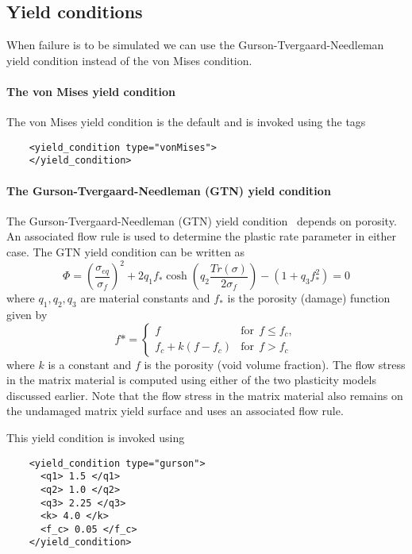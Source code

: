   \subsection{Yield conditions}
  When failure is to be simulated we can use the Gurson-Tvergaard-Needleman
  yield condition instead of the von Mises condition.

  \paragraph{The von Mises yield condition}
  The von Mises yield condition is the default and is invoked using the tags
  \lstset{language=XML}
  \begin{lstlisting}
    <yield_condition type="vonMises">
    </yield_condition>
  \end{lstlisting}

  \paragraph{The Gurson-Tvergaard-Needleman (GTN) yield condition}
  The Gurson-Tvergaard-Needleman (GTN) yield 
  condition~\cite{Gurson1977,Tver1984} depends on porosity.  An associated 
  flow rule is used to determine the plastic rate parameter in either case.
  The GTN yield condition can be written as
  \begin{equation}
    \Phi = \left(\frac{\sigma_{eq}}{\sigma_f}\right)^2 +
    2 q_1 f_* \cosh \left(q_2 \frac{Tr(\sigma)}{2\sigma_f}\right) -
    (1+q_3 f_*^2) = 0
  \end{equation}
  where $q_1,q_2,q_3$ are material constants and $f_*$ is the porosity 
  (damage) function given by
  \begin{equation}
    f* = 
    \begin{cases}
      f & \text{for}~~ f \le f_c,\\ 
      f_c + k (f - f_c) & \text{for}~~ f > f_c 
    \end{cases}
  \end{equation}
  where $k$ is a constant and $f$ is the porosity (void volume fraction).  The 
  flow stress in the matrix material is computed using either of the two 
  plasticity models discussed earlier.  Note that the flow stress in the matrix 
  material also remains on the undamaged matrix yield surface and uses an 
  associated flow rule.

  This yield condition is invoked using
  \lstset{language=XML}
  \begin{lstlisting}
    <yield_condition type="gurson">
      <q1> 1.5 </q1>
      <q2> 1.0 </q2>
      <q3> 2.25 </q3>
      <k> 4.0 </k>
      <f_c> 0.05 </f_c>
    </yield_condition>
  \end{lstlisting}


